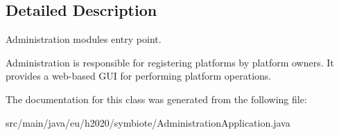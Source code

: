 \subsection{Detailed Description}
Administration module\textquotesingle{}s entry point. 

Administration is responsible for registering platforms by platform owners. It provides a web-\/based G\+UI for performing platform operations. 

The documentation for this class was generated from the following file\+:\begin{DoxyCompactItemize}
\item 
src/main/java/eu/h2020/symbiote/Administration\+Application.\+java\end{DoxyCompactItemize}
